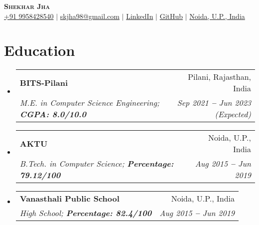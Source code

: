 \documentclass[letterpaper,11pt]{article}
\makeatletter
\newcommand{\resumeSubheading}[4]{
  \vspace{-2pt}\item
    \begin{tabular*}{0.97\textwidth}[t]{l@{\extracolsep{\fill}}r}
      \textbf{#1} & #2 \\
      \textit{\small#3} & \textit{\small #4} \\
    \end{tabular*}\vspace{-7pt}
}
\newcommand{\resumeEducationHeading}[4]{
  \vspace{-2pt}\item
    \begin{tabular*}{0.97\textwidth}[t]{l@{\extracolsep{\fill}}r}
      \textbf{#1} & #2 \\
      \textit{\small#3} & \textit{\small #4} \\
    \end{tabular*}\vspace{-5pt}
}
\newcommand{\resumeSubHeadingListStart}{\begin{itemize}[leftmargin=0.15in, label={}]}
\newcommand{\resumeSubHeadingListEnd}{\end{itemize}}
\makeatother
\begin{document}

\begin{center}
    \textbf{\Huge \scshape Shekhar Jha} \\ \vspace{3pt}
    \small
    \faMobile \hspace{.5pt} \href{tel:919958428540}{+91 9958428540}
    $|$
    \faAt \hspace{.5pt} \href{mailto:skjha98@gmail.com}{skjha98@gmail.com}
    $|$
    \faLinkedinSquare \hspace{.5pt} \href{https://www.linkedin.com/in/shekhar-jha/}{LinkedIn}
    $|$
    \faGithub \hspace{.5pt} \href{https://github.com/skjha98}{GitHub}
    $|$
    \faMapMarker \hspace{.5pt} \href{https://www.google.com/maps/place/Noida,+Uttar+Pradesh/@28.5222018,77.4018255,12z/data=!3m1!4b1!4m6!3m5!1s0x390ce5a43173357b:0x37ffce30c87cc03f!8m2!3d28.5355161!4d77.3910265!16zL20vMDN3dHow?entry=ttu}{Noida, U.P., India}
\end{center}




\section{Education}
  \vspace{3pt}
  \resumeSubHeadingListStart
    
    \resumeEducationHeading
      {BITS-Pilani}{Pilani, Rajasthan, India}
      {M.E. in Computer Science Engineering;   \textbf{CGPA: 8.0/10.0}}{Sep 2021 \textbf{--} Jun 2023 (Expected)}
    
    \resumeSubheading
      {AKTU}{Noida, U.P., India}
      {B.Tech. in Computer Science;   \textbf{Percentage: 79.12/100}}{Aug 2015 \textbf{--} Jun 2019}
    \resumeSubheading
      {Vanasthali Public School}{Noida, U.P., India}
      {High School;   \textbf{Percentage: 82.4/100}}{Aug 2015 \textbf{--} Jun 2019}
    
  \resumeSubHeadingListEnd




  
\end{document}
